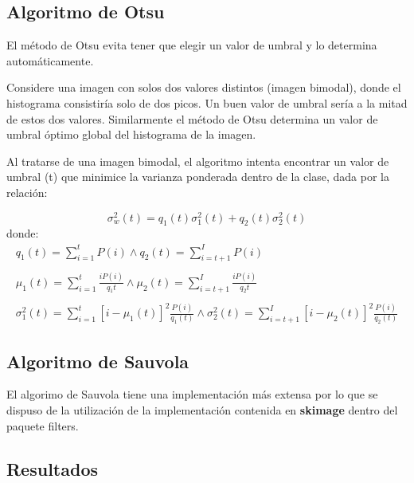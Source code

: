 \subsection{Algoritmo de Otsu}
El método de Otsu evita tener que elegir un valor de umbral y lo determina automáticamente.

Considere una imagen con solos dos valores distintos (imagen bimodal), donde el histograma consistiría solo de dos picos. Un buen valor de umbral sería a la mitad de estos dos valores. Similarmente el método de Otsu determina un valor de umbral óptimo global del histograma de la imagen.

Al tratarse de una imagen bimodal, el algoritmo intenta encontrar un valor de umbral (t) que minimice la varianza ponderada dentro de la clase, dada por la relación:

\begin{equation}
	\sigma _ {w} ^{2}(t) = q_{1}(t) \sigma _{1}^2(t) + q_{2}(t) \sigma _{2}^2(t)
\end{equation}
donde:
\begin{equation}
	\begin{array}{l}
		q_{1}(t) = \sum_{i=1}^{t} P(i) \wedge q_{2}(t) = \sum_{i=t+1}^{I} P(i)\\\\
		\mu_{1}(t) = \sum_{i=1}^{t} \frac{i P(i)}{q_1{t}} \wedge \mu_{2}(t) = \sum_{i=t+1}^{I} \frac{i P(i)}{q_2{t}}\\\\
		\sigma_{1}^2(t) = \sum_{i = 1}^{t} [i - \mu_{1}(t)]^2 \frac{P(i)}{q_{1}(t)} \wedge \sigma_{2}^2(t) = \sum_{i = t+1}^{I} [i - \mu_{2}(t)]^2 \frac{P(i)}{q_{2}(t)}
	\end{array}
\end{equation}



\subsection{Algoritmo de Sauvola}

El algorimo de Sauvola tiene una implementación más extensa por lo que se dispuso de la utilización de la implementación contenida en \textbf{skimage} dentro del paquete filters.




\subsection{Resultados}


